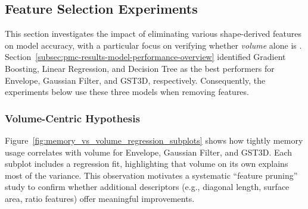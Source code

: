 \subsection{Feature Selection Experiments}
\label{subsec:pmc-results-feature-selection-experiments}


This section investigates the impact of eliminating various shape-derived features on model accuracy, with a particular focus on verifying whether \emph{volume} alone is .
Section~\ref{subsec:pmc-results-model-performance-overview} identified Gradient Boosting, Linear Regression, and Decision Tree as the best performers for Envelope, Gaussian Filter, and \ac{GST3D}, respectively.
Consequently, the experiments below use these three models when removing features.

\subsubsection{Volume-Centric Hypothesis}
\label{subsec:feature-selection-volume-centric-hypothesis}

Figure~\ref{fig:memory_vs_volume_regression_subplots} shows how tightly memory usage correlates with volume for Envelope, Gaussian Filter, and \ac{GST3D}.
Each subplot includes a regression fit, highlighting that volume on its own explains most of the variance.
This observation motivates a systematic “feature pruning” study to confirm whether additional descriptors (e.g., diagonal length, surface area, ratio features) offer meaningful improvements.

